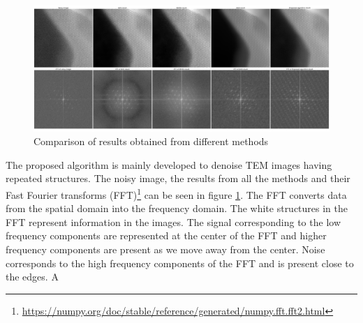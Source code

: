 \documentclass[fleqn,10pt]{wlscirep}
\begin{document}
\begin{figure}
	\centering
	\includegraphics[scale=0.09]{./imgs/comparison.jpg}
	\caption{Comparison of results obtained from different methods}
	\label{fig:comparison}
\end{figure}


The proposed algorithm is mainly developed to denoise TEM images having repeated structures. The noisy image, the results from all the methods and their Fast Fourier transforms (FFT)\footnote{\url{https://numpy.org/doc/stable/reference/generated/numpy.fft.fft2.html}} can be seen in figure \ref{fig:comparison}. The FFT converts data from the spatial domain into the frequency domain. The white structures in the FFT represent information in the images. The signal corresponding to the low frequency components are represented at the center of the FFT and higher frequency components are present as we move away from the center. Noise corresponds to the high frequency components of the FFT and is present close to the edges. A
\end{document}
